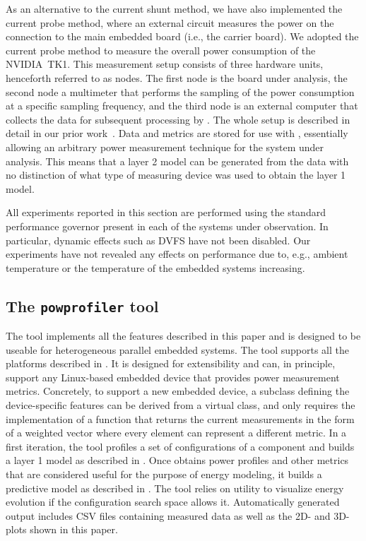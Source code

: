 As an alternative to the current shunt method, we have also implemented the current probe method, where an external circuit measures the power on the connection to the main embedded board (i.e., the carrier board). We adopted the current probe method to measure the overall power consumption of the NVIDIA~TK1. This measurement setup consists of three hardware units, henceforth referred to as nodes. The first node is the board under analysis, the second node a multimeter that performs the sampling of the power consumption at a specific sampling frequency, and the third node is an external computer that collects the data for subsequent processing by \powprof{}. The whole setup is described in detail in our prior work~\citep{seewald2019hlpgpu}. Data and metrics are stored for use with \powprof{}, essentially allowing an arbitrary power measurement technique for the system under analysis. This means that a layer 2 model can be generated from the data with no distinction of what type of measuring device was used to obtain the layer 1 model.

All experiments reported in this section are performed using the standard performance governor present in each of the systems under observation. In particular, dynamic effects such as DVFS have not been disabled. Our experiments have not revealed any effects on performance due to, e.g., ambient temperature or the temperature of the embedded systems increasing.

\subsection{\color{cyan}The {\tt powprofiler} tool}

The \powprof{} tool implements all the features described in this paper and is designed to be useable for heterogeneous parallel embedded systems. The tool supports all the platforms described in . It is designed for extensibility and can, in principle, support any Linux-based embedded device that provides power measurement metrics. Concretely, to support a new embedded device, a subclass defining the device-specific features can be derived from a virtual class, and only requires the implementation of a function that returns the current measurements in the form of a weighted vector where every element can represent a different metric. In a first iteration, the tool profiles a set of configurations of a component and builds a layer 1 model as described in . Once \powprof{} obtains power profiles and other metrics that are considered useful for the purpose of energy modeling, it builds a predictive model as described in . The tool relies on  utility to visualize energy evolution if the configuration search space allows it. Automatically generated output includes CSV files containing measured data as well as the 2D- and 3D-plots shown in this paper.

